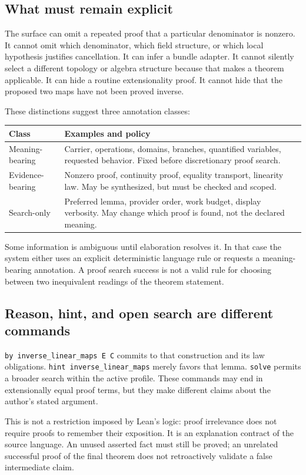 \documentclass[11pt,letterpaper]{article}
\newcommand{\code}[1]{\nolinkurl{#1}}
\theoremstyle{definition}
\theoremstyle{remark}
\begin{document}
\subsection{What must remain explicit}
The surface can omit a repeated proof that a particular denominator is nonzero.
It cannot omit which denominator, which field structure, or which local
hypothesis justifies cancellation. It can infer a bundle adapter. It cannot
silently select a different topology or algebra structure because that makes a
theorem applicable. It can hide a routine extensionality proof. It cannot hide
that the proposed two maps have not been proved inverse.

These distinctions suggest three annotation classes:
\begin{center}
\begin{tabularx}{\linewidth}{@{}P{.23\linewidth}Y@{}}
\toprule Class & Examples and policy\\\midrule
Meaning-bearing & Carrier, operations, domains, branches, quantified variables,
requested behavior. Fixed before discretionary proof search.\\
Evidence-bearing & Nonzero proof, continuity proof, equality transport,
linearity law. May be synthesized, but must be checked and scoped.\\
Search-only & Preferred lemma, provider order, work budget, display verbosity.
May change which proof is found, not the declared meaning.\\\bottomrule
\end{tabularx}
\end{center}
Some information is ambiguous until elaboration resolves it. In that case the
system either uses an explicit deterministic language rule or requests a
meaning-bearing annotation. A proof search success is not a valid rule for
choosing between two inequivalent readings of the theorem statement.

\subsection{Reason, hint, and open search are different commands}
\code{by inverse_linear_maps E C} commits to that construction and its law
obligations. \code{hint inverse_linear_maps} merely favors that lemma.
\code{solve} permits a broader search within the active profile. These commands
may end in extensionally equal proof terms, but they make different claims about
the author's stated argument.

This is not a restriction imposed by Lean's logic: proof irrelevance does not
require proofs to remember their exposition. It is an explanation contract of
the source language. An unused asserted fact must still be proved; an unrelated
successful proof of the final theorem does not retroactively validate a false
intermediate claim.
\end{document}
